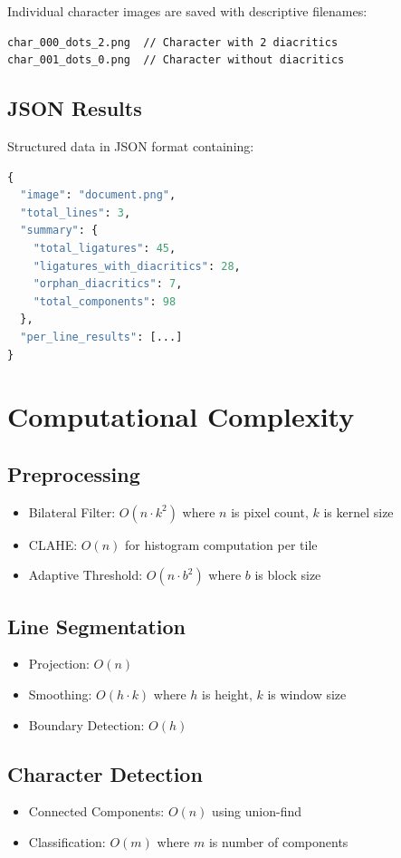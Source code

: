 \documentclass[12pt,a4paper,oneside]{report}
\begin{document}
Individual character images are saved with descriptive filenames:
\begin{verbatim}
char_000_dots_2.png  // Character with 2 diacritics
char_001_dots_0.png  // Character without diacritics
\end{verbatim}

\subsection{JSON Results}

Structured data in JSON format containing:
\begin{lstlisting}[language=Python, caption=JSON Output Structure]
{
  "image": "document.png",
  "total_lines": 3,
  "summary": {
    "total_ligatures": 45,
    "ligatures_with_diacritics": 28,
    "orphan_diacritics": 7,
    "total_components": 98
  },
  "per_line_results": [...]
}
\end{lstlisting}

\section{Computational Complexity}

\subsection{Preprocessing}
\begin{itemize}
    \item Bilateral Filter: $O(n \cdot k^2)$ where $n$ is pixel count, $k$ is kernel size
    \item CLAHE: $O(n)$ for histogram computation per tile
    \item Adaptive Threshold: $O(n \cdot b^2)$ where $b$ is block size
\end{itemize}

\subsection{Line Segmentation}
\begin{itemize}
    \item Projection: $O(n)$
    \item Smoothing: $O(h \cdot k)$ where $h$ is height, $k$ is window size
    \item Boundary Detection: $O(h)$
\end{itemize}

\subsection{Character Detection}
\begin{itemize}
    \item Connected Components: $O(n)$ using union-find
    \item Classification: $O(m)$ where $m$ is number of components
\end{itemize}
\end{document}
